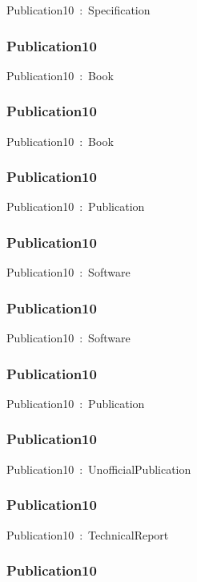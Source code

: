 \documentclass{article}
\begin{document}
Publication10~:~Specification

\subsubsection*{Publication10}

Publication10~:~Book

\subsubsection*{Publication10}

Publication10~:~Book

\subsubsection*{Publication10}

Publication10~:~Publication

\subsubsection*{Publication10}

Publication10~:~Software

\subsubsection*{Publication10}

Publication10~:~Software

\subsubsection*{Publication10}

Publication10~:~Publication

\subsubsection*{Publication10}

Publication10~:~UnofficialPublication

\subsubsection*{Publication10}

Publication10~:~TechnicalReport

\subsubsection*{Publication10}
\end{document}
